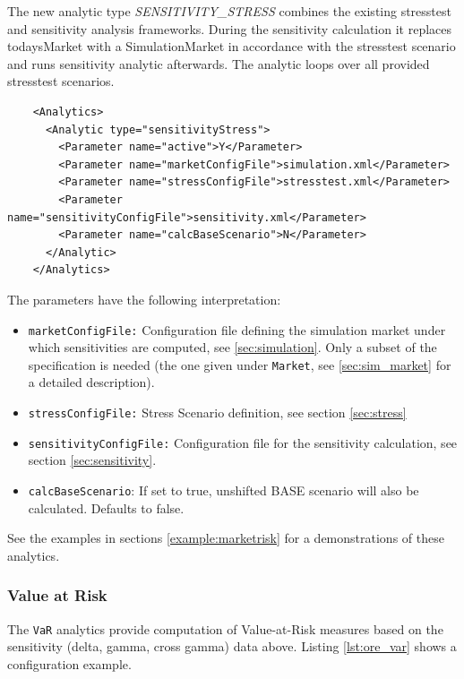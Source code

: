 The new analytic type \emph{SENSITIVITY\_STRESS} combines the existing stresstest and sensitivity analysis frameworks. During the sensitivity calculation it replaces todaysMarket with a SimulationMarket in accordance with the stresstest scenario and runs sensitivity analytic afterwards. The analytic loops over all provided stresstest scenarios.

\begin{listing}[H]
  \begin{verbatim}
    <Analytics>
      <Analytic type="sensitivityStress">
        <Parameter name="active">Y</Parameter>
        <Parameter name="marketConfigFile">simulation.xml</Parameter>
        <Parameter name="stressConfigFile">stresstest.xml</Parameter>
        <Parameter name="sensitivityConfigFile">sensitivity.xml</Parameter>
        <Parameter name="calcBaseScenario">N</Parameter>
      </Analytic>
    </Analytics>
  \end{verbatim}
  \caption{ORE analytic: Stressed Sensitivity Analysis}
  \label{lst:ore_sensistress}
  \end{listing}

The parameters have the following interpretation:

\begin{itemize}
  \item {\tt marketConfigFile:} Configuration file defining the simulation market under which sensitivities are computed,
    see \ref{sec:simulation}. Only a subset of the specification is needed (the one given under {\tt Market}, see
    \ref{sec:sim_market} for a detailed description).
  \item {\tt stressConfigFile:} Stress Scenario definition, see section \ref{sec:stress}
  \item {\tt sensitivityConfigFile:} Configuration file  for the sensitivity calculation, see section \ref{sec:sensitivity}.
  \item {\tt calcBaseScenario}: If set to true, unshifted BASE scenario will also be calculated. Defaults to false.
\end{itemize}

See the examples in sections \ref{example:marketrisk} for a demonstrations of these analytics.

\subsubsection{Value at Risk}

The {\tt VaR} analytics provide computation of Value-at-Risk measures based on the sensitivity (delta, gamma, cross gamma) data above. Listing \ref{lst:ore_var} shows a configuration example.

